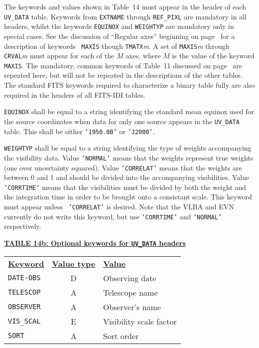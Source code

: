 \documentclass[twoside]{article}
\newcommand{\Hi}[1]{\textcolor{hicol}{#1}}
\newcommand{\Me}[1]{\textcolor{mecol}{#1}}
\begin{document}
The keywords and values shown in Table~\Hi{14} must appear in the
header of each {\tt UV\_DATA} table.  \Hi{Keywords from {\tt EXTNAME}
through {\tt REF\_PIXL} are mandatory \Me{in all headers}, whilst the
keywords \Me{{\tt EQUINOX} and {\tt WEIGHTYP} are mandatory only in
special cases}.  See the discussion of ``Regular axes'' beginning on
page~\pageref{UVdata:regaxes} for a description of keywords {\tt
  MAXIS} though {\tt TMATX}{\it m}.  A set of {\tt MAXIS}{\it m}
through {\tt CRVAL}{\it m} must appear for each of the $M$ axes,
where $M$ is the value of the keyword {\tt MAXIS}\@.  The mandatory,
common keywords of Table~11 discussed on page~\pageref{ta:keywords}
are repeated here, but will not be repeated in the descriptions of the
other tables.  The standard FITS keywords required to characterize a
binary table fully are also required in the headers of all FITS-IDI
tables.}

\Me{{\tt EQUINOX} shall be equal to a string identifying the standard
  mean equinox used for the source coordinates when data for only one
  source appears in the {\tt UV\_DATA} table.  This shall be either
  {\tt '1950.0B'} or {\tt 'J2000'}\@.}

\Me{{\tt WEIGHTYP} shall be equal to a string identifying the type of
  weights accompanying the visibility data.  Value {\tt 'NORMAL'}
  means that the weights represent true weights (one over uncertainty
  squared).  Value {\tt 'CORRELAT'} means that the weights are between
  0 and 1 and should be divided into the accompanying visibilities.
  Value {\tt 'CORRTIME'} means that the visibilities must be divided
  by both the weight and the integration time in order to be brought
  onto a consistant scale.  This keyword must appear unless {\tt
    'CORRELAT'} is desired.  Note that the VLBA and EVN currently do
  not write this keyword, but use {\tt 'CORRTIME'} and {\tt 'NORMAL'}
  respectively.}

\begin{center}
\underline{\bf{TABLE \Hi{14\Me{b}: Optional keywords for {\tt UV\_DATA} headers}}}\\
\begin{tabular}{lcl}
\noalign{\vspace{2pt}}
\underline{{\bf Keyword}} & \underline{\bf{Value type}} &
    \underline{\bf{Value\vphantom{y}}} \\
\noalign{\vspace{2pt}}
{\tt DATE-OBS}  & D & Observing date \\
{\tt TELESCOP}  & A & Telescope name \\
{\tt OBSERVER}  & A & Observer's name \\
{\tt VIS\_SCAL} & E & Visibility scale factor \\
{\tt SORT}      & A & Sort order
\end{tabular}
\end{center}
\end{document}
